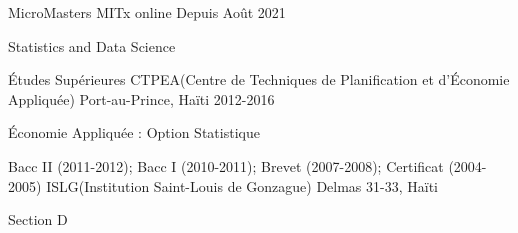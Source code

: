 


\begin{cventries}


\cventry
{MicroMasters} %
{MITx} %
{online} %
{Depuis Ao\^ut 2021} %
{ %
\begin{cvitems}
\item {Statistics and Data Science}
\end{cvitems}
}


\cventry
{\'Etudes Supérieures} %
{CTPEA(Centre de Techniques de Planification et d'\'Economie Appliquée)} %
{Port-au-Prince, Ha\"iti} %
{2012-2016} %
{ %
\begin{cvitems}
\item {\'Economie Appliquée : Option Statistique}
\end{cvitems}
}





\cventry
{Bacc II (2011-2012); Bacc I (2010-2011); Brevet (2007-2008); Certificat (2004-2005)} %
{ISLG(Institution Saint-Louis de Gonzague)} %
{Delmas 31-33, Ha\"iti} %
{} %
{ %
\begin{cvitems}
\item {Section D}
\end{cvitems}
}

\end{cventries}